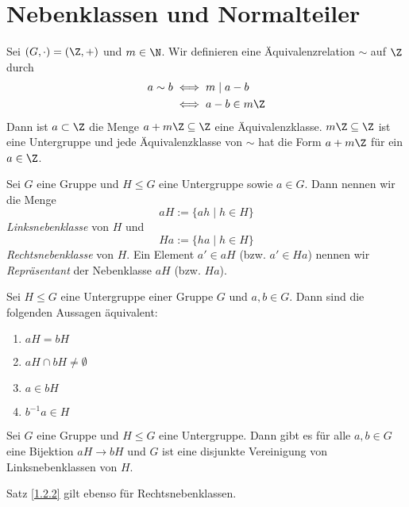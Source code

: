 \section{Nebenklassen und Normalteiler}\lecture

\begin{exmp*}
	Sei $ (G,\cdot)  = (\Z,+) $ und $m \in \N$. Wir definieren eine Äquivalenzrelation $\sim$ auf $\Z$ durch
	\begin{align*}
		a \sim b &\iff m \mid a-b\\
		&\iff a-b \in m\Z
	\end{align*}
	Dann ist $a \subset \Z$ die Menge $a+m\Z \subseteq \Z$ eine Äquivalenzklasse. $m\Z \subseteq \Z$ ist eine Untergruppe und jede Äquivalenzklasse von $\sim$ hat die Form $a+m\Z$ für ein $a \in \Z$.
\end{exmp*}

\begin{defn*}[Nebenklasse] 
	Sei $G$ eine Gruppe und $H \leq G$ eine Untergruppe sowie $a \in G$. Dann nennen wir die Menge
	\[ aH := \{ ah \mid h \in H\} \]
	\emph{Linksnebenklasse} von $H$ und 
	\[ Ha := \{ha \mid h \in H\} \]
	\emph{Rechtsnebenklasse} von $H$. Ein Element $a' \in aH$ (bzw. $a' \in Ha$) nennen wir \emph{Repräsentant} der Nebenklasse $aH$ (bzw. $Ha$).
\end{defn*}

\begin{lem}
	Sei $ H \leq G $ eine Untergruppe einer Gruppe $G$ und $ a,b\in G $. Dann sind die folgenden Aussagen äquivalent:
	\begin{enumerate}[label={\roman*})]
		\item $aH = bH$
		\item $aH \cap bH \neq \emptyset$
		\item $a \in bH$
		\item $b^{-1}a \in H$
	\end{enumerate}
\end{lem}

\begin{thm}\label{1.2.2}
	Sei $G$ eine Gruppe und $H \leq G$ eine Untergruppe. Dann gibt es für alle $a,b \in G$ eine Bijektion $aH \to bH$ und $G$ ist eine disjunkte Vereinigung von Linksnebenklassen von $H$.
\end{thm}

\begin{rem*}
	Satz \ref{1.2.2} gilt ebenso für Rechtsnebenklassen.
\end{rem*}


